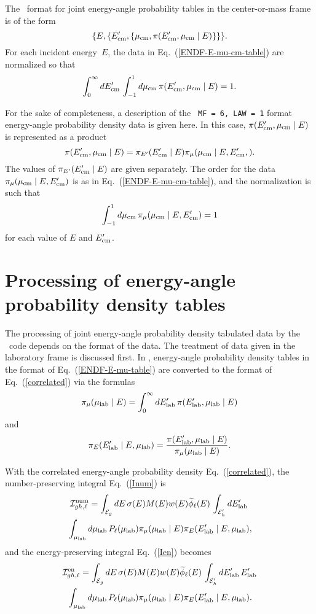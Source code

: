 The \xendl\ format for joint energy-angle probability tables in the
center-or-mass frame is of the form
\begin{equation}
  \{ E, \{ E_{\text{cm}}', \{ \mu_{\text{cm}}, \pi(E_{\text{cm}}', \mu_{\text{cm}} \mid E) \} \} \}.
 \label{ENDF-E-mu-cm-table}
\end{equation}
For each incident energy~$E$, the data in Eq.~(\ref{ENDF-E-mu-cm-table})
are normalized so that
$$
  \int_0^\infty dE_{\text{cm}}' \, \int_{-1}^1 d\mu_{\text{cm}} \, \pi(E_{\text{cm}}', \mu_{\text{cm}} \mid E) = 1.
$$

For the sake of completeness, a description of the
\ENDF\  \texttt{MF = 6, LAW = 1} format energy-angle probability density
data is given here.  In this case, $\pi(E_{\text{cm}}', \mu_{\text{cm}} \mid E)$
is represented as a product
$$
  \pi(E_{\text{cm}}', \mu_{\text{cm}} \mid E) = \pi_{E'}(E_{\text{cm}}' \mid E)
   \pi_\mu(\mu_{\text{cm}} \mid E, E_{\text{cm}}', ).
$$
The values of $\pi_{E'}(E_{\text{cm}}' \mid E)$ are given separately.
The order for the data $\pi_\mu( \mu_{\text{cm}} \mid E, E_{\text{cm}}')$ is as
in Eq.~(\ref{ENDF-E-mu-cm-table}), and the normalization is
such that
$$
  \int_{-1}^1 d\mu_{\text{cm}} \, \pi_\mu(\mu_{\text{cm}} \mid E, E_{\text{cm}}') = 1
$$
for each value of $E$ and $E_{\text{cm}}'$.

\section{Processing of energy-angle probability density tables}
\label{Sec:joint-table-process}
The processing of joint energy-angle probability density tabulated
data by the \gettransfer\ code depends on the format of the data.
The treatment of data given in  the laboratory frame is discussed first.
In \gettransfer, energy-angle probability density
tables in the format of Eq.~(\ref{ENDF-E-mu-table}) are converted to
the format of Eq.~(\ref{correlated}) via the formulas
$$
  \pi_\mu(\mu_{\text{lab}} \mid E) = \int_0^\infty dE_{\text{lab}}' \, \pi(E_{\text{lab}}', \mu_{\text{lab}} \mid E)
$$
and
$$
  \pi_E(E_{\text{lab}}' \mid E, \mu_{\text{lab}}) = \frac
    {\pi(E_{\text{lab}}', \mu_{\text{lab}} \mid E)} {\pi_\mu(\mu_{\text{lab}} \mid E)}.
$$

With the correlated energy-angle probability density
Eq.~(\ref{correlated}), the number-preserving integral Eq.~(\ref{Inum}) is
\begin{multline}
   {\cal I}^{\text{num}}_{gh,\ell} =
        \int_{{\cal E}_g} dE \, \sigma ( E ) M(E) w(E) \widetilde \phi_\ell(E) 
       \, \int_{{\cal E}_h' } dE_{\text{lab}}' \, \\
       \, \int_{\mu_{\text{lab}}} d\mu_{\text{lab}} \,  P_\ell( \mu_{\text{lab}} ) \pi_\mu(\mu_{\text{lab}} \mid E)\pi_E(E_{\text{lab}}' \mid E, \mu_{\text{lab}}),
  \label{Inum-corr}
\end{multline}
and the energy-preserving integral Eq.~(\ref{Ien}) becomes
\begin{multline}
  {\cal I}^{\text{en}}_{gh,\ell} =
     \int_{{\cal E}_g} dE \, \sigma ( E ) M(E) w(E) \widetilde \phi_\ell(E) 
     \, \int_{{\cal E}_h' } dE_{\text{lab}}' \,  E_{\text{lab}}' \\
     \, \int_{\mu_{\text{lab}}} d\mu_{\text{lab}}  \,  P_\ell ( \mu_{\text{lab}} ) \pi_\mu(\mu_{\text{lab}} \mid E)\pi_E(E_{\text{lab}}' \mid E, \mu_{\text{lab}}).
  \label{Ien-corr}
\end{multline}


